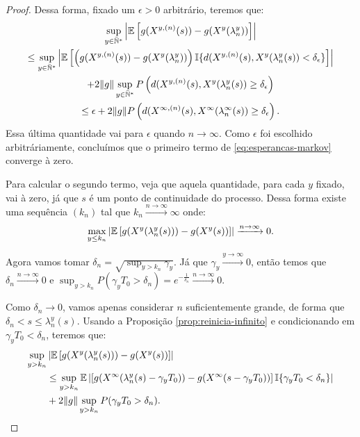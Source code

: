 \begin{proof}
  Dessa forma, fixado um $\epsilon > 0$ arbitrário, teremos que:
  \begin{gather*}
    \sup_{y\in{\mathbb{\bar{N}^*}}} \left\lvert {\mathbb{E}} \left[ g(X^{y,(n)}(s)) -
        g(X^{y}(\lambda_n^y)) \right]
    \right\rvert\\
    \leq \sup_{y\in{\mathbb{\bar{N}^*}}} \left\lvert {\mathbb{E}} \left[ \left(g(X^{y,(n)}(s)) -
          g(X^{y}(\lambda_n^y)) \right) {\mathbb{I}}\{ d(X^{y, (n)}(s),
        X^y(\lambda_n^y(s)) < \delta_\epsilon \} \right]
    \right\rvert \\
    + 2\Vert g \Vert \sup_{y \in {\mathbb{\bar{N}^*}}} P\left( d(X^{y, (n)}(s),
      X^y(\lambda_n^y(s)) \geq
      \delta_\epsilon \right) \\
    \leq \epsilon + 2 \Vert g \Vert P \left( d(X^{\infty, (n)}(s),
      X^\infty(\lambda_n^\infty(s)) \geq \delta_\epsilon \right).
  \end{gather*}
  Essa última quantidade vai para $\epsilon$ quando $n\to
  \infty$. Como $\epsilon$ foi escolhido arbitráriamente, concluímos
  que o primeiro termo de \eqref{eq:esperancas-markov} converge à
  zero.

  Para calcular o segundo termo, veja que aquela quantidade, para cada
  $y$ fixado, vai à zero, já que $s$ é \qc um ponto de continuidade do
  processo. Dessa forma existe uma sequência $(k_n)$ tal que $k_n
  \xrightarrow{n\to\infty} \infty$ onde:
  \begin{displaymath}
      \max_{y \leq k_n} \left\lvert
      {\mathbb{E}} \left[g(X^y(\lambda_n^y(s))) - g(X^y(s)) \right]
    \right\rvert \xrightarrow{n\to \infty} 0.
  \end{displaymath}

  Agora vamos tomar $\delta_n = \sqrt{\sup_{y > k_n}\gamma_y}$. Já
  que $\gamma_y \xrightarrow{y\to\infty} 0$, então temos que $\delta_n
  \xrightarrow{n\to\infty} 0$ e  $\sup_{y > k_n} P(\gamma_y T_0 > \delta_n) = 
  e^{-\frac{1}{\delta_n}} \xrightarrow{n\to\infty} 0$.

  Como $\delta_n \to 0$, vamos apenas considerar $n$ suficientemente
  grande, de forma que $\delta_n < s \leq \lambda_n^y(s)$. Usando a Proposição
  \ref{prop:reinicia-infinito} e condicionando em $\gamma_yT_0 <
  \delta_n$, teremos que:
  \begin{align}
    \label{eq:markov-quase-la}
    \sup_{y > k_n}& \left\lvert {\mathbb{E}} \left[g(X^y(\lambda_n^y(s))) -
        g(X^y(s)) \right]
    \right\rvert \notag \\
    &\leq \sup_{y > k_n} {\mathbb{E}} \left\lvert
      \left[g(X^\infty(\lambda_n^y(s)-\gamma_yT_0)) -
        g(X^\infty(s-\gamma_yT_0)) \right] {\mathbb{I}}\{ \gamma_yT_0 <
      \delta_n \}
    \right\rvert\\
    &+ 2 \Vert g \Vert \sup_{y > k_n} P(\gamma_y T_0 > \delta_n).
    \notag
  \end{align}


\end{proof}
